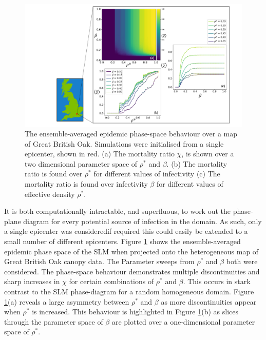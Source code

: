 \begin{figure}
    \centering
    \includegraphics[scale=0.32]{chapter4/figures/figure6.pdf}
    \caption{The ensemble-averaged epidemic phase-space behaviour over a map of Great British Oak. Simulations were initialised from a single epicenter, shown in red. (a) The mortality ratio $\chi$, is shown over a two dimensional parameter space of $\rho^*$  and $\beta$. (b) The mortality ratio is found over $\rho^{*}$ for different values of infectivity (c) The mortality ratio is found over infectivity $\beta$ for different values of effective density $\rho^{*}$.}
    \label{fig:heterogeneous-phase-space}
\end{figure}

 It is both computationally intractable, and superfluous, to work out the phase-plane diagram for every potential source of infection in the domain. %
 As such, only a single epicenter was considered\textemdash if required %
this could easily be extended to a small number of different epicenters. %
Figure \ref{fig:heterogeneous-phase-space} shows the ensemble-averaged epidemic phase space of the SLM when projected onto the heterogeneous map of Great British Oak canopy data. %
The Parameter sweeps from $\rho^{*}$ and $\beta$ both were considered. %
The phase-space behaviour demonstrates multiple discontinuities and sharp increases in $\chi$ for certain combinations of $\rho^{*}$ and $\beta$. %
This occurs in stark contrast to the SLM phase-diagram for a random homogeneous domain. %
Figure \ref{fig:heterogeneous-phase-space}(a) reveals a large asymmetry between $\rho^*$ and $\beta$ as more discontinuities appear when $\rho^*$ is increased. %
This behaviour is highlighted in Figure \ref{fig:heterogeneous-phase-space}(b) as slices through the parameter space of $\beta$ are plotted over a one-dimensional parameter space of $\rho^*$. %

